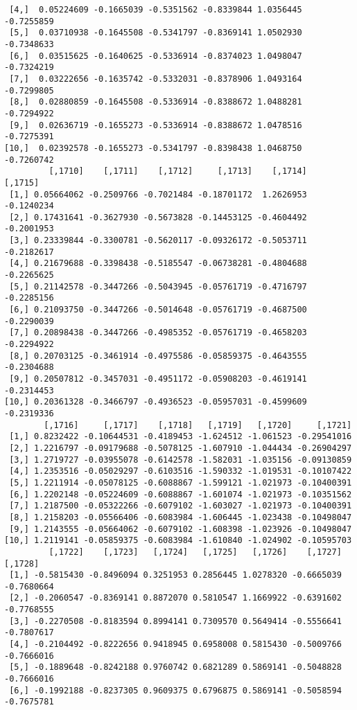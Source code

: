 \documentclass[
  letterpaper,
  DIV=11,
  numbers=noendperiod]{scrreprt}
\begin{document}
\begin{verbatim}
 [4,]  0.05224609 -0.1665039 -0.5351562 -0.8339844 1.0356445 -0.7255859
 [5,]  0.03710938 -0.1645508 -0.5341797 -0.8369141 1.0502930 -0.7348633
 [6,]  0.03515625 -0.1640625 -0.5336914 -0.8374023 1.0498047 -0.7324219
 [7,]  0.03222656 -0.1635742 -0.5332031 -0.8378906 1.0493164 -0.7299805
 [8,]  0.02880859 -0.1645508 -0.5336914 -0.8388672 1.0488281 -0.7294922
 [9,]  0.02636719 -0.1655273 -0.5336914 -0.8388672 1.0478516 -0.7275391
[10,]  0.02392578 -0.1655273 -0.5341797 -0.8398438 1.0468750 -0.7260742
         [,1710]    [,1711]    [,1712]     [,1713]    [,1714]    [,1715]
 [1,] 0.05664062 -0.2509766 -0.7021484 -0.18701172  1.2626953 -0.1240234
 [2,] 0.17431641 -0.3627930 -0.5673828 -0.14453125 -0.4604492 -0.2001953
 [3,] 0.23339844 -0.3300781 -0.5620117 -0.09326172 -0.5053711 -0.2182617
 [4,] 0.21679688 -0.3398438 -0.5185547 -0.06738281 -0.4804688 -0.2265625
 [5,] 0.21142578 -0.3447266 -0.5043945 -0.05761719 -0.4716797 -0.2285156
 [6,] 0.21093750 -0.3447266 -0.5014648 -0.05761719 -0.4687500 -0.2290039
 [7,] 0.20898438 -0.3447266 -0.4985352 -0.05761719 -0.4658203 -0.2294922
 [8,] 0.20703125 -0.3461914 -0.4975586 -0.05859375 -0.4643555 -0.2304688
 [9,] 0.20507812 -0.3457031 -0.4951172 -0.05908203 -0.4619141 -0.2314453
[10,] 0.20361328 -0.3466797 -0.4936523 -0.05957031 -0.4599609 -0.2319336
        [,1716]     [,1717]    [,1718]   [,1719]   [,1720]     [,1721]
 [1,] 0.8232422 -0.10644531 -0.4189453 -1.624512 -1.061523 -0.29541016
 [2,] 1.2216797 -0.09179688 -0.5078125 -1.607910 -1.044434 -0.26904297
 [3,] 1.2719727 -0.03955078 -0.6142578 -1.582031 -1.035156 -0.09130859
 [4,] 1.2353516 -0.05029297 -0.6103516 -1.590332 -1.019531 -0.10107422
 [5,] 1.2211914 -0.05078125 -0.6088867 -1.599121 -1.021973 -0.10400391
 [6,] 1.2202148 -0.05224609 -0.6088867 -1.601074 -1.021973 -0.10351562
 [7,] 1.2187500 -0.05322266 -0.6079102 -1.603027 -1.021973 -0.10400391
 [8,] 1.2158203 -0.05566406 -0.6083984 -1.606445 -1.023438 -0.10498047
 [9,] 1.2143555 -0.05664062 -0.6079102 -1.608398 -1.023926 -0.10498047
[10,] 1.2119141 -0.05859375 -0.6083984 -1.610840 -1.024902 -0.10595703
         [,1722]    [,1723]   [,1724]   [,1725]   [,1726]    [,1727]    [,1728]
 [1,] -0.5815430 -0.8496094 0.3251953 0.2856445 1.0278320 -0.6665039 -0.7680664
 [2,] -0.2060547 -0.8369141 0.8872070 0.5810547 1.1669922 -0.6391602 -0.7768555
 [3,] -0.2270508 -0.8183594 0.8994141 0.7309570 0.5649414 -0.5556641 -0.7807617
 [4,] -0.2104492 -0.8222656 0.9418945 0.6958008 0.5815430 -0.5009766 -0.7666016
 [5,] -0.1889648 -0.8242188 0.9760742 0.6821289 0.5869141 -0.5048828 -0.7666016
 [6,] -0.1992188 -0.8237305 0.9609375 0.6796875 0.5869141 -0.5058594 -0.7675781

\end{verbatim}
\end{document}
